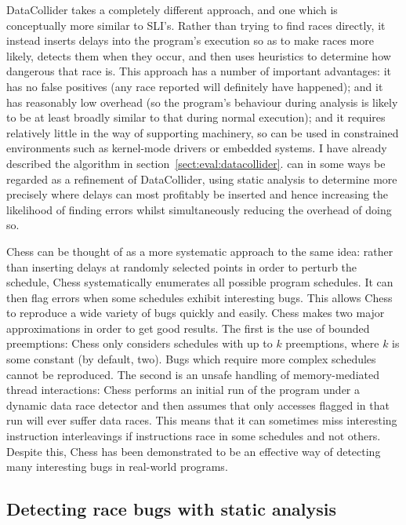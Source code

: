 DataCollider\needCite{} takes a completely different approach, and one
which is conceptually more similar to SLI's.  Rather than trying to
find races directly, it instead inserts delays into the program's
execution so as to make races more likely, detects them when they
occur, and then uses heuristics to determine how dangerous that race
is.  This approach has a number of important advantages: it has no
false positives (any race reported will definitely have happened); and
it has reasonably low overhead (so the program's behaviour during
analysis is likely to be at least broadly similar to that during
normal execution); and it requires relatively little in the way of
supporting machinery, so can be used in constrained environments such
as kernel-mode drivers or embedded systems.  I have already described
the algorithm in section~\ref{sect:eval:datacollider}.  {\Technique}
can in some ways be regarded as a refinement of DataCollider, using
static analysis to determine more precisely where delays can most
profitably be inserted and hence increasing the likelihood of finding
errors whilst simultaneously reducing the overhead of doing so.

Chess\needCite{} can be thought of as a more systematic approach to
the same idea: rather than inserting delays at randomly selected
points in order to perturb the schedule, Chess systematically
enumerates all possible program schedules.  It can then flag errors
when some schedules exhibit interesting bugs.  This allows Chess to
reproduce a wide variety of bugs quickly and easily.  Chess makes two
major approximations in order to get good results.  The first is the
use of bounded preemptions: Chess only considers schedules with up to
$k$ preemptions, where $k$ is some constant (by default, two).  Bugs
which require more complex schedules cannot be reproduced.  The second
is an unsafe handling of memory-mediated thread interactions: Chess
performs an initial run of the program under a dynamic data race
detector and then assumes that only accesses flagged in that run will
ever suffer data races.  This means that it can sometimes miss
interesting instruction interleavings if instructions race in some
schedules and not others.  Despite this, Chess has been demonstrated
to be an effective way of detecting many interesting bugs in
real-world programs.

\subsection{Detecting race bugs with static analysis}

